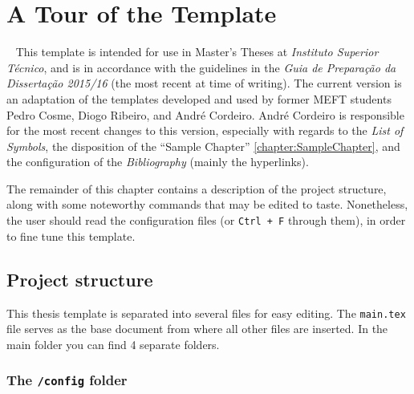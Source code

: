 \chapter{A Tour of the Template}
\label{chapter:template_tour}
~
This template is intended for use in Master's Theses at \textit{Instituto Superior Técnico}, and is in accordance with the guidelines in the \textit{Guia de Preparação da Dissertação 2015/16} (the most recent at time of writing). The current version is an adaptation of the templates developed and used by former MEFT students Pedro Cosme, Diogo Ribeiro, and André Cordeiro. André Cordeiro is responsible for the most recent changes to this version, especially with regards to the \textit{List of Symbols}, the disposition of the ``Sample Chapter'' \ref{chapter:SampleChapter}, and the configuration of the \textit{Bibliography} (mainly the hyperlinks).

The remainder of this chapter contains a description of the project structure, along with some noteworthy commands that may be edited to taste. Nonetheless, the user should read the configuration files (or \texttt{Ctrl + F} through them), in order to fine tune this template.


\section{Project structure}

This thesis template is separated into several files for easy editing. The \texttt{main.tex} file serves as the base document from where all other files are inserted. In the main folder you can find 4 separate folders.

\subsection{The {\normalfont\texttt{/config}} folder} %

